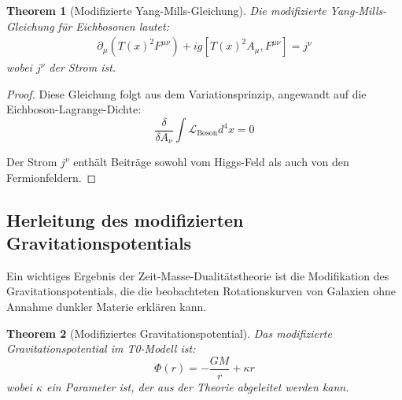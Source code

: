 \documentclass{article}
\newtheorem{theorem}{Theorem}[section]
\theoremstyle{definition}
\theoremstyle{remark}
\newcommand{\Tfield}{T(x)} %
\begin{document}
		\begin{theorem}[Modifizierte Yang-Mills-Gleichung]
			Die modifizierte Yang-Mills-Gleichung für Eichbosonen lautet:
			\begin{multline}
				\partial_\mu(\Tfield^2 F^{\mu\nu}) + ig[\Tfield^2 A_\mu, F^{\mu\nu}] = j^\nu
			\end{multline}
			wobei $j^\nu$ der Strom ist.
		\end{theorem}
		
		\begin{proof}
			Diese Gleichung folgt aus dem Variationsprinzip, angewandt auf die Eichboson-Lagrange-Dichte:
			\begin{equation}
				\frac{\delta}{\delta A_\nu}\int \mathcal{L}_{\text{Boson}} d^4x = 0
			\end{equation}
			
			Der Strom $j^\nu$ enthält Beiträge sowohl vom Higgs-Feld als auch von den Fermionfeldern.
		\end{proof}
		
		\subsection{Herleitung des modifizierten Gravitationspotentials}
		
		Ein wichtiges Ergebnis der Zeit-Masse-Dualitätstheorie ist die Modifikation des Gravitationspotentials, die die beobachteten Rotationskurven von Galaxien ohne Annahme dunkler Materie erklären kann.
		
		\begin{theorem}[Modifiziertes Gravitationspotential]
			Das modifizierte Gravitationspotential im T0-Modell ist:
			\begin{equation}
				\Phi(r) = -\frac{GM}{r} + \kappa r
			\end{equation}
			wobei $\kappa$ ein Parameter ist, der aus der Theorie abgeleitet werden kann.
		\end{theorem}
		
\end{document}
